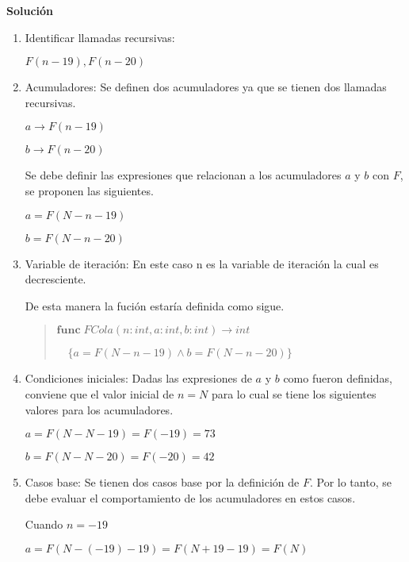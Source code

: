 \documentclass[hidelinks]{article}
\newenvironment{absolutelynopagebreak}
{\Needspace{10\baselineskip}\begin{quote}}
		{\end{quote}}
\begin{document}
\textbf{Solución}

\begin{enumerate}
	\item Identificar llamadas recursivas:\par
	      $F(n - 19), F(n - 20)$\par
	\item Acumuladores: Se definen dos acumuladores ya que se tienen dos llamadas
	      recursivas.\par
	      $a \rightarrow F(n - 19)$\par
	      $b \rightarrow F(n - 20)$\par
	      Se debe definir las expresiones que relacionan a los acumuladores $a$ y $b$ con
	      $F$, se proponen las siguientes.\par
	      \begin{center}
		      $a = F(N - n - 19)$\par
		      $b = F(N - n - 20)$\par
	      \end{center}
	\item Variable de iteración: En este caso n es la variable de iteración la cual es
	      decresciente.\par
	      De esta manera la fución estaría definida como sigue.\par
	      \begin{absolutelynopagebreak}
		      $\textbf{func} \; FCola(n: int, a: int, b: int) \rightarrow int$ \par
		      $\quad\{a = F(N - n - 19) \land b = F(N - n - 20)\}$\par
	      \end{absolutelynopagebreak}\par
	\item Condiciones iniciales: Dadas las expresiones de $a$ y $b$ como fueron
	      definidas, conviene que el valor inicial de $n = N$ para lo cual se tiene los
	      siguientes valores para los acumuladores.\par
	      $a = F(N - N - 19) = F(-19) = 73$\par
	      $b = F(N - N - 20) = F(-20) = 42$\par
	\item Casos base: Se tienen dos casos base por la definición de $F$. Por lo tanto, se
	      debe evaluar el comportamiento de los acumuladores en estos casos.\par
	      Cuando $n = -19$\par
	      $a = F(N - (-19) - 19) = F(N + 19 - 19) = F(N)$\par

\end{enumerate}
\end{document}
